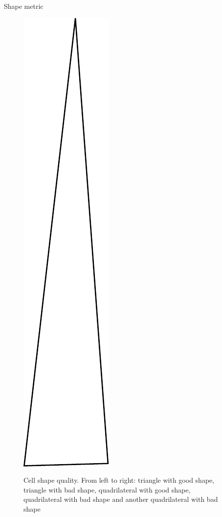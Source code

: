 \documentclass[t,12pt]{beamer}
\begin{document}
\begin{frame}{Shape metric}
\begin{figure}
{ 		\includegraphics[scale=0.15]{tri_bad}
 	}
 	\hspace{0.2in}
 	\caption{Cell shape quality. From left to right: triangle with good shape, triangle with bad shape, quadrilateral with good shape, quadrilateral with bad shape and another quadrilateral with bad shape}
 	\label{fig:shape}
 \end{figure}
\end{frame}
\end{document}
